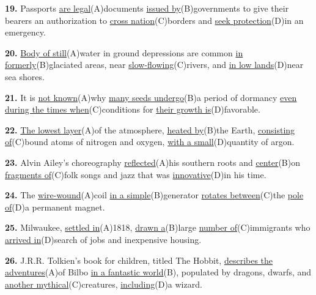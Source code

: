 \documentclass[12pt]{article}
\begin{document}
\par
\vspace{\questionblockgap}
\noindent\textbf{19.} Passports \uline{are legal}(A)documents \uline{issued by}(B)governments to give their bearers an authorization to \uline{cross nation}(C)borders and \uline{seek protection}(D)in an emergency.
\par
\vspace{\questionblockgap}
\noindent\textbf{20.} \uline{Body of still}(A)water in ground depressions are common \uline{in formerly}(B)glaciated areas, near \uline{slow-flowing}(C)rivers, and \uline{in low lands}(D)near sea shores.
\par
\vspace{\questionblockgap}
\noindent\textbf{21.} It is \uline{not known}(A)why \uline{many seeds undergo}(B)a period of dormancy \uline{even during the times when}(C)conditions for \uline{their growth is}(D)favorable.
\par
\vspace{\questionblockgap}
\noindent\textbf{22.} \uline{The lowest layer}(A)of the atmosphere, \uline{heated by}(B)the Earth, \uline{consisting of}(C)bound atoms of nitrogen and oxygen, \uline{with a small}(D)quantity of argon.
\par
\vspace{\questionblockgap}
\noindent\textbf{23.} Alvin Ailey's choreography \uline{reflected}(A)his southern roots and \uline{center}(B)on \uline{fragments of}(C)folk songs and jazz that was \uline{innovative}(D)in his time.
\par
\vspace{\questionblockgap}
\noindent\textbf{24.} The \uline{wire-wound}(A)coil \uline{in a simple}(B)generator \uline{rotates between}(C)the \uline{pole of}(D)a permanent magnet.
\par
\vspace{\questionblockgap}
\noindent\textbf{25.} Milwaukee, \uline{settled in}(A)1818, \uline{drawn a}(B)large \uline{number of}(C)immigrants who \uline{arrived in}(D)search of jobs and inexpensive housing.
\par
\vspace{\questionblockgap}
\noindent\textbf{26.} J.R.R. Tolkien's book for children, titled The Hobbit, \uline{describes the adventures}(A)of Bilbo \uline{in a fantastic world}(B), populated by dragons, dwarfs, and \uline{another mythical}(C)creatures, \uline{including}(D)a wizard.
\par
\vspace{\questionblockgap}
\end{document}
